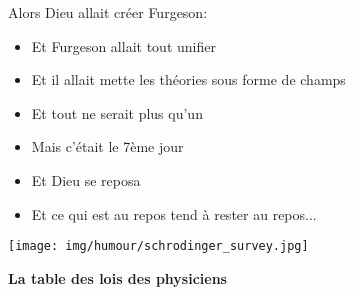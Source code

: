Alors Dieu allait créer Furgeson:
\begin{itemize}
	\item Et Furgeson allait tout unifier
	\item Et il allait mette les théories sous forme de champs
	\item Et tout ne serait plus qu'un
	\item Mais c'était le 7ème jour
	\item Et Dieu se reposa
	\item Et ce qui est au repos tend à rester au repos...
\end{itemize}

	\pagebreak

	\begin{center}
		\texttt{[image: img/humour/schrodinger\_survey.jpg]}	
	\end{center}

\begin{center}\underline{\hspace{5 cm}}\end{center}
\begin{center}
\textbf{La table des lois des physiciens}
\end{center}

